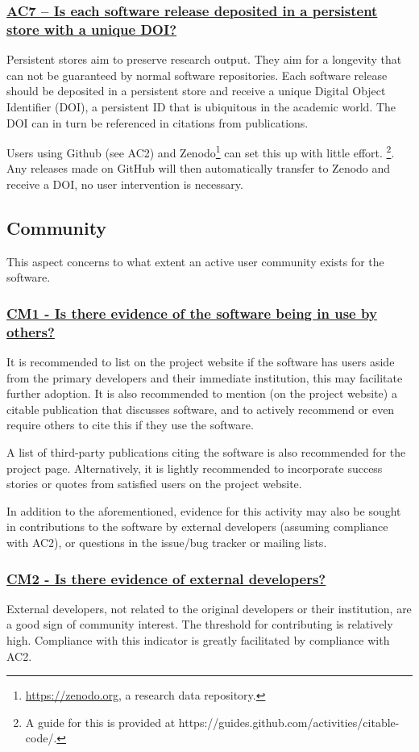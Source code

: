 \documentclass[a4paper,11pt]{article}
\newcommand{\indicator}[1]{\subsubsection*{\underline{#1}}}
\begin{document}
\indicator{AC7 -- Is each software release deposited in a persistent store with a unique DOI?}

Persistent stores aim to preserve research output. They aim for a longevity
that can not be guaranteed by normal software repositories. Each software
release should be deposited in a persistent store and receive a unique Digital
Object Identifier (DOI),  a persistent ID that is ubiquitous in the academic
world. The DOI can in turn be referenced in citations from publications.

Users using Github (see AC2) and Zenodo\footnote{\url{https://zenodo.org}, a
research data repository.} can set this up with little effort. \footnote{A guide
for this is provided at https://guides.github.com/activities/citable-code/.}.
Any releases made on GitHub will then automatically transfer to Zenodo and
receive a DOI, no user intervention is necessary. 

\subsection{Community}

This aspect concerns to what extent an active user community exists for the
software.

\indicator{CM1 - Is there evidence of the software being in use by others?}

It is recommended to list on the project website if the software has 
users aside from the primary developers and their immediate institution, this
may facilitate further adoption. It is also recommended to mention (on the
project website) a citable publication that discusses software, and to actively
recommend or even require others to cite this if they use the software.

A list of third-party publications citing the software is also recommended for
the project page. Alternatively, it is lightly recommended to
incorporate success stories or quotes from satisfied users on the project
website.

In addition to the aforementioned, evidence for this activity may also be sought
in contributions to the software by external developers (assuming
compliance with AC2), or questions in the issue/bug tracker or mailing lists.

\indicator{CM2 - Is there evidence of external developers?}

External developers, not related to the original developers or their
institution, are a good sign of community interest. The threshold for
contributing is relatively high. Compliance with this indicator is greatly
facilitated by compliance with AC2.
\end{document}
